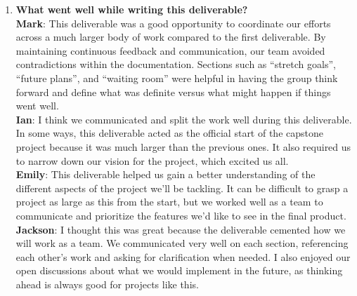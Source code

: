 \documentclass{article}
\begin{document}
\begin{enumerate}
  \item \textbf{What went well while writing this deliverable?} \\
  \textbf{Mark}: This deliverable was a good opportunity to coordinate our efforts across a much larger body of work compared to the first deliverable. By maintaining continuous feedback and communication, our team avoided contradictions within the documentation. Sections such as “stretch goals”, “future plans”, and “waiting room” were helpful in having the group think forward and define what was definite versus what might happen if things went well. \\
  \textbf{Ian}: I think we communicated and split the work well during this deliverable. In some ways, this deliverable acted as the official start of the capstone project because it was much larger than the previous ones. It also required us to narrow down our vision for the project, which excited us all. \\
  \textbf{Emily}: This deliverable helped us gain a better understanding of the different aspects of the project we’ll be tackling. It can be difficult to grasp a project as large as this from the start, but we worked well as a team to communicate and prioritize the features we’d like to see in the final product. \\
  \textbf{Jackson}: I thought this was great because the deliverable cemented how we will work as a team. We communicated very well on each section, referencing each other’s work and asking for clarification when needed. I also enjoyed our open discussions about what we would implement in the future, as thinking ahead is always good for projects like this. \\


\end{enumerate}
\end{document}

